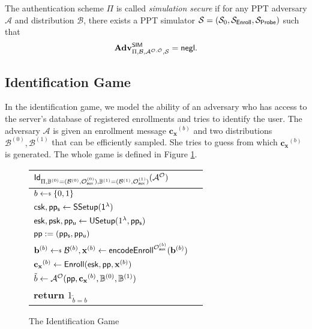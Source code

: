 The authentication scheme $\Pi$ is called \emph{simulation secure} if for any PPT adversary $\mathcal{A}$ and distribution $\mathcal{B}$, there exists a PPT simulator $\mathcal{S} = (\mathcal{S}_0, \mathcal{S}_{\sf Enroll}, \mathcal{S}_{\sf Probe})$ such that
\[
	\mathbf{Adv}^{\sf SIM}_{\Pi, \mathcal{B}, \mathcal{A}^{\mathcal{O}, \tilde{\mathcal{O}}}, \mathcal{S}} = \mathsf{negl}.
\]


\subsection*{Identification Game}
\label{sec:id_game}

In the identification game, we model the ability of an adversary who has access to the server's database of registered enrollments and tries to identify the user. The adversary $\mathcal{A}$ is given an enrollment message $\mathbf{c_x}^{(b)}$ and two distributions $\mathcal{B}^{(0)}, \mathcal{B}^{(1)}$ that can be efficiently sampled. She tries to guess from which $\mathbf{c_x}^{(b)}$ is generated. The whole game is defined in Figure \ref{fig:id_game}.

\begin{figure}[h]
	\begin{center}
	\begin{tabular}{l c}
		${\sf Id}_{\Pi, \mathbb{B}^{(0)} = (\mathcal{B}^{(0)}, \mathcal{O}_{\sf aux}^{(0)}) , \mathbb{B}^{(1)} = (\mathcal{B}^{(1)}, \mathcal{O}_{\sf aux}^{(1)} )}(\mathcal{A}^\mathcal{O})$\\

			\hline

			$b \getsdollar \{0, 1\}$ \\

			${\sf csk}, {\sf pp_s} \gets {\sf SSetup(1^\lambda)}$ \\

			${\sf esk}, {\sf psk}, {\sf pp_u} \gets {\sf USetup}(1^\lambda, {\sf pp_s})$ \\

			${\sf pp}:= ({\sf pp_s}, {\sf pp_u})$ \\

			$ \mathbf{b}^{(b)} \getsdollar \mathcal{B}^{(b)}, \mathbf{x}^{(b)} \gets {\sf encodeEnroll}^{\mathcal{O}_{\sf aux}^{(b)}}(\mathbf{b}^{(b)})$ \\

			$\mathbf{c_x}^{(b)} \gets {\sf Enroll}({\sf esk}, {\sf pp}, \mathbf{x}^{(b)})$ \\

			$\tilde{b} \gets \mathcal{A}^{\mathcal{O}} ( {\sf pp}, \mathbf{c_x}^{(b)}, \mathbb{B}^{(0)}, \mathbb{B}^{(1)} )$ \\

			\textbf{return} $1_{\tilde{b} = b}$
			
	\end{tabular}
	\end{center}
	\caption{The Identification Game}
	\label{fig:id_game}
\end{figure}


